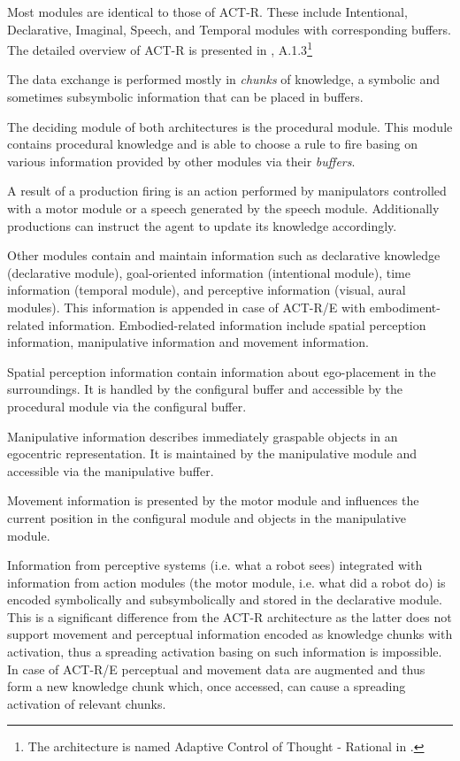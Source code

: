 \documentclass[10pt]{article}
\begin{document}
Most modules are identical to those of ACT-R. These include Intentional, Declarative, Imaginal, Speech, and Temporal modules with corresponding buffers. The detailed overview of ACT-R is presented in \cite{cosmos}, A.1.3\footnote{The architecture is named Adaptive Control of Thought - Rational in \cite{cosmos}.}

The data exchange is performed mostly in \emph{chunks} of knowledge, a symbolic and sometimes subsymbolic information that can be placed in buffers.

The deciding module of both architectures is the procedural module. This module contains procedural knowledge and is able to choose a rule to fire basing on various information provided by other modules via their \emph{buffers}. 

A result of a production firing is an action performed by manipulators controlled with a motor module or a speech generated by the speech module. Additionally productions can instruct the agent to update its knowledge accordingly.

Other modules contain and maintain information such as declarative knowledge (declarative module), goal-oriented information (intentional module), time information (temporal module), and perceptive information (visual, aural modules). This information is appended in case of ACT-R/E with embodiment-related information. Embodied-related information include spatial perception information, manipulative information and movement information.

Spatial perception information contain information about ego-placement in the surroundings. It is handled by the configural buffer and accessible by the procedural module via the configural buffer.

Manipulative information describes immediately graspable objects in an egocentric representation. It is maintained by the manipulative module and accessible via the manipulative buffer.

Movement information is presented by the motor module and influences the current position in the configural module and objects in the manipulative module. 

Information from perceptive systems (i.e. what a robot sees) integrated with information from action modules (the motor module, i.e. what did a robot do) is encoded symbolically and subsymbolically and stored in the declarative module. This is a significant difference from the ACT-R architecture as the latter does not support movement and perceptual information encoded as knowledge chunks with activation, thus a spreading activation basing on such information is impossible. In case of ACT-R/E perceptual and movement data are augmented and thus form a new knowledge chunk which, once accessed, can cause a spreading activation of relevant chunks.
\end{document}
